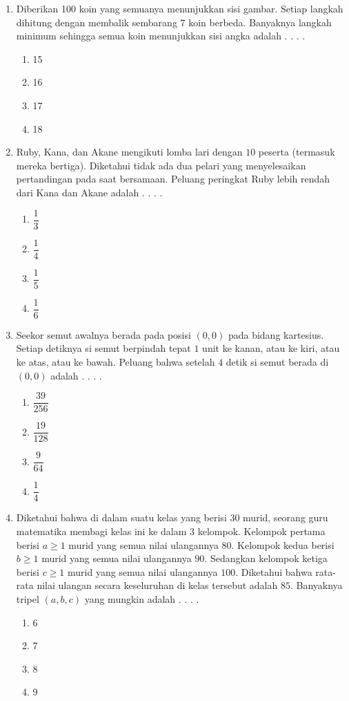 \documentclass{article}
\begin{document}
\begin{enumerate}[label={Soal \arabic*}]
    \item Diberikan 100 koin yang semuanya menunjukkan sisi gambar. Setiap langkah dihitung dengan membalik sembarang 7 koin berbeda. Banyaknya langkah minimum sehingga semua koin menunjukkan sisi angka adalah . . . .
    \begin{enumerate}[label={(\Alph*)}]
        \item 15 \item 16 \item 17 \item 18
    \end{enumerate}

    \item Ruby, Kana, dan Akane mengikuti lomba lari dengan $10$ peserta (termasuk mereka bertiga). Diketahui tidak ada dua pelari yang menyelesaikan pertandingan pada saat bersamaan. Peluang peringkat Ruby lebih rendah dari Kana dan Akane adalah . . . .
    \begin{enumerate}[label={(\Alph*)}]
        \item $\dfrac{1}{3}$ \item $\dfrac{1}{4}$ \item $\dfrac{1}{5}$ \item $\dfrac{1}{6}$
    \end{enumerate}

    \item Seekor semut awalnya berada pada posisi $(0, 0)$ pada bidang kartesius. Setiap detiknya si semut berpindah tepat $1$ unit ke kanan, atau ke kiri, atau ke atas, atau ke bawah. Peluang bahwa setelah $4$ detik si semut berada di $(0, 0)$ adalah . . . .
    \begin{enumerate}[label={(\Alph*)}]
        \item $\dfrac{39}{256}$ \item $\dfrac{19}{128}$ \item $\dfrac{9}{64}$ \item $\dfrac{1}{4}$
    \end{enumerate}

    \item Diketahui bahwa di dalam suatu kelas yang berisi $30$ murid, seorang guru matematika membagi kelas ini ke dalam 3 kelompok. Kelompok pertama berisi $a\ge 1$ murid yang semua nilai ulangannya $80$. Kelompok kedua berisi $b\ge 1$ murid yang semua nilai ulangannya $90$. Sedangkan kelompok ketiga berisi $c\ge 1$ murid yang semua nilai ulangannya $100$. Diketahui bahwa rata-rata nilai ulangan secara keseluruhan di kelas tersebut adalah $85$. Banyaknya tripel $(a,b,c)$ yang mungkin adalah . . . .
    \begin{enumerate}[label={(\Alph*)}]
        \item 6 \item 7 \item 8 \item 9
    \end{enumerate}


\end{enumerate}
\end{document}
